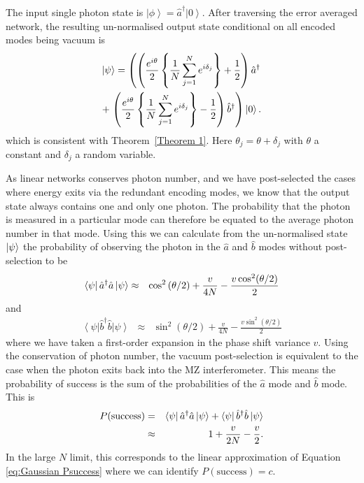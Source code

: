 \documentclass[aps,pra,twocolumn,superscriptaddress,numerical,floatfix]{revtex4-1}
\begin{document}
The input single photon state is $\left|\phi\right\rangle = \hat{a}^{\dagger}\left|0\right\rangle $.  After traversing the error averaged network, the resulting un-normalised output state conditional on all encoded modes being vacuum is
\begin{multline}
	\ket{\psi} = \left(
	\left( \frac{e^{i\theta}}{2} \left\{\frac{1}{N}\sum_{j=1}^{N}e^{i\delta_{j}}\right\} + \frac{1}{2}\right) \hat{a}^{\dagger}  \right. \\
	+ \left. \left(\frac{e^{i\theta}}{2} \left\{\frac{1}{N}\sum_{j=1}^{N}e^{i\delta_{j}}\right\} - \frac{1}{2}\right) \hat{b}^{\dagger} 
	\right)
	\ket{0}.
	\label{eq:1ParbN}
\end{multline}
which is consistent with Theorem~\ref{Theorem 1}. Here $\theta_{j}=\theta+\delta_{j}$ with $\theta$ a constant and $\delta_j$ a random variable. 

As linear networks conserves photon number, and we have post-selected the cases where energy exits via the redundant encoding modes, we know that the output state always contains one and only one photon.  The probability that the photon is measured in a particular mode can therefore be equated to the average photon number in that mode.  Using this we can calculate from the un-normalised state $\ket{\psi}$ the probability of observing the photon in the $\hat{a}$ and $\hat{b}$ modes without post-selection to be 
\begin{eqnarray}
	\bra{\psi} \hat{a}^{\dagger}\hat{a} \ket{\psi} & \approx & \cos^{2}\left(\theta/2\right)+\frac{v}{4N}-\frac{v\cos^{2}(\theta/2)}{2}
\end{eqnarray}
and
\begin{eqnarray}
	\left\langle \psi\right|\hat{b}^{\dagger}\hat{b}\left|\psi\right\rangle & \approx & \sin^{2}\left(\theta/2\right)+\frac{v}{4N}-\frac{v\sin^{2}(\theta/2)}{2}
\end{eqnarray}
where we have taken a first-order expansion in the phase shift variance $v$.
Using the conservation of photon number, the vacuum post-selection is equivalent to the case when the photon exits back into the MZ interferometer.  This means the probability of success is the sum of the probabilities of the $\hat{a}$ mode and $\hat{b}$ mode.  This is 
\begin{eqnarray}
	P(\textrm{success}) & = & \bra{\psi}\hat{a}^{\dagger}\hat{a}\ket{\psi} +\bra{\psi}\hat{b}^{\dagger}\hat{b}\ket{\psi} \\
	& \approx & 1+\frac{v}{2N}-\frac{v}{2}. \label{eq:1pNarbitrary successs}
\end{eqnarray}
In the large $N$ limit, this corresponds to the linear approximation of Equation \ref{eq:Gaussian Psuccess} where we can identify $P(\textrm{success})=c$. 
\end{document}
